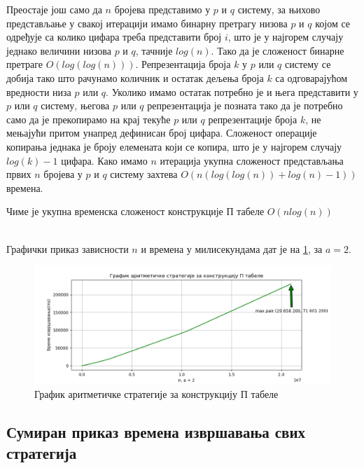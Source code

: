 \documentclass[a4paper]{article}
\begin{document}
Преостаје још само да $ n $ бројева представимо у $ p $ и $ q $ систему, за њихово представљање у свакој итерацији имамо бинарну претрагу низова $ p $ и $ q $ којом се одређује са колико цифара треба представити број $ i $, што је у најгорем случају једнако величини низова $ p $ и $ q $, тачније $ log(n) $. Тако да је сложеност бинарне претраге $ O(log(log(n))) $. Репрезентација броја $ k $ у $ p $ или $ q $ систему се добија тако што рачунамо количник и остатак дељења броја $ k $ са одговарајућом вредности низа $ p $ или $ q $. Уколико имамо остатак потребно је и њега представити у $ p $ или $ q $ систему, његова $ p $ или $ q $ репрезентација је позната тако да је потребно само да је прекопирамо на крај текуће $ p $ или $ q $ репрезентације броја $ k $, не мењајући притом унапред дефинисан број цифара. Сложеност операције копирања једнака је броју елемената који се копира, што је у најгорем случају $ log(k) - 1 $ цифара. Како имамо $ n $ итерација укупна сложеност представљања првих $ n $ бројева у $ p $ и $ q $ систему захтева $ O(n(log(log(n)) + log(n) - 1)) $ времена.

Чиме је укупна временска сложеност конструкције П табеле $ O(nlog(n)) $



\leavevmode\\
Графички приказ зависности $ n $ и времена у милисекундама дат је на \ref{fig:arithmetic}, за $ a = 2 $.

\begin{figure}[H]
	\caption{График аритметичке стратегије за конструкцију П табеле}
	\label{fig:arithmetic}
	\begin{center}
		\includegraphics[width=\textwidth]{arithmetic.png}
	\end{center}
\end{figure}

\subsection{Сумиран приказ времена извршавања свих стратегија}
\end{document}
